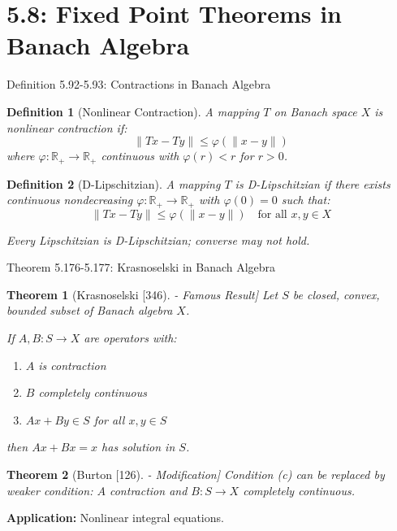 \documentclass[aspectratio=169,10pt]{beamer}
\theoremstyle{plain}
\newtheorem*{theorem*}{Theorem}
\newtheorem*{definition*}{Definition}
\begin{document}
\section{5.8: Fixed Point Theorems in Banach Algebra}

\begin{frame}{Definition 5.92-5.93: Contractions in Banach Algebra}
  \begin{definition*}[Nonlinear Contraction]
    A mapping $T$ on Banach space $X$ is nonlinear contraction if:
    $$\|Tx - Ty\| \leq \varphi(\|x - y\|)$$
    where $\varphi: \mathbb{R}_+ \to \mathbb{R}_+$ continuous with $\varphi(r) < r$ for $r > 0$.
  \end{definition*}

  \vspace{1em}

  \begin{definition*}[D-Lipschitzian]
    A mapping $T$ is D-Lipschitzian if there exists continuous nondecreasing
    $\varphi: \mathbb{R}_+ \to \mathbb{R}_+$ with $\varphi(0) = 0$ such that:
    $$\|Tx - Ty\| \leq \varphi(\|x - y\|) \quad \text{for all } x,y \in X$$
  \end{definition*}

  \vspace{1em}

  \textit{Every Lipschitzian is D-Lipschitzian; converse may not hold.}
\end{frame}

\begin{frame}{Theorem 5.176-5.177: Krasnoselski in Banach Algebra}
  \begin{theorem*}[Krasnoselski [346] - Famous Result]
    Let $S$ be closed, convex, bounded subset of Banach algebra $X$.

    If $A, B: S \to X$ are operators with:
    \begin{enumerate}
      \item $A$ is contraction
      \item $B$ completely continuous
      \item $Ax + By \in S$ for all $x,y \in S$
    \end{enumerate}

    then $Ax + Bx = x$ has solution in $S$.
  \end{theorem*}

  \vspace{1em}

  \begin{theorem*}[Burton [126] - Modification]
    Condition (c) can be replaced by weaker condition:
    $A$ contraction and $B: S \to X$ completely continuous.
  \end{theorem*}

  \vspace{0.5em}

  \textbf{Application:} Nonlinear integral equations.
\end{frame}
\end{document}

